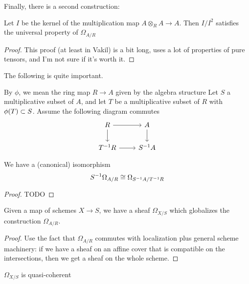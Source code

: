 Finally, there is a second construction:
\begin{lemma}
	\label{lem:explicit_kahler_diff_I_mod_ISquared}
	
	Let \(I\) be the kernel of the multiplication
	map \(A \otimes_{R} A \to A\).
	Then \(I / I^{2}\) 
	satisfies the universal property of \(\Omega_{A / R}\)
\end{lemma}

\begin{proof}
	This proof (at least in Vakil) is a bit long, uses a lot 
	of properties of pure tensors, and I'm not sure
	if it's worth it.
\end{proof}

The following is quite important.
\begin{lemma}
	\label{lem:kahler_diff_commutes_with_loczn}
	By \(\phi\), we mean the ring map \(R \to A\) 
	given by the algebra structure
	Let \(S\) a multiplicative subset of \(A\),
	and let \(T\) be a multiplicative subset
	of \(R\) with \(\phi(T) \subset S\).
	Assume the following diagram commutes
	\[
	\begin{tikzcd}
	R \arrow{r}{} \arrow{d}[swap]{} &
	A \arrow{d}{} \\
	T^{-1}R \arrow{r}{} &
	S^{-1}A
	\end{tikzcd}
	\]
	
	We have a (canonical) isomorphism
	\[
	S^{-1}\Omega_{A / R} \cong
	\Omega_{S^{-1}A / T^{-1}R}	
	\] 
\end{lemma}

\begin{proof}
	TODO
\end{proof}

\begin{definition}
	\label{def:kahler_diff_sheaf}
	Given a map of schemes 
	\(X \to S\),
	we have a 
	sheaf \(\Omega_{X / S}\) 
	which globalizes the construction
	\(\Omega_{A / R}\).
\end{definition}

\begin{proof}
	Use the fact that 
	\(\Omega_{A / R}\)
	commutes with localization 
	plus general scheme machinery:
	if we have a sheaf on an affine 
	cover that is compatible on the intersections,
	then we get a sheaf on the whole scheme.
\end{proof}

\begin{lemma}
	\label{lem:kahler_diff_sheaf_quasi_coh}
	\(\Omega_{X / S}\) is quasi-coherent
\end{lemma}

